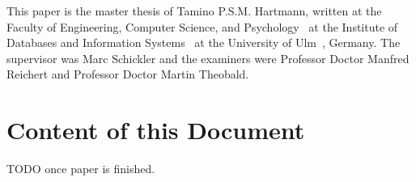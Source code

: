 This paper is the master thesis of Tamino P.S.M. Hartmann, written at the Faculty of Engineering, Computer Science, and Psychology~\cite{web:site:faculty} at the Institute of Databases and Information Systems~\cite{web:site:institute} at the University of Ulm~\cite{web:site:uni_ulm}, Germany.
The supervisor was Marc Schickler and the examiners were Professor Doctor Manfred Reichert and Professor Doctor Martin Theobald.

\section{Content of this Document}

TODO once paper is finished.

